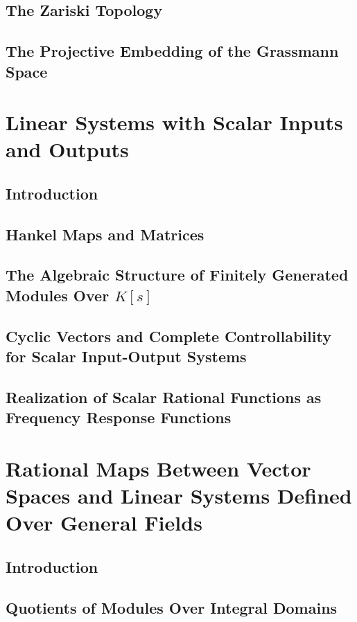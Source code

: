 \documentclass[12pt]{book}
\theoremstyle{plain}
\theoremstyle{definition}
\begin{document}
\section{The Zariski Topology}

\section{The Projective Embedding of the Grassmann Space}

\chapter{Linear Systems with Scalar Inputs and Outputs}

\section{Introduction}

\section{Hankel Maps and Matrices}

\section{The Algebraic Structure of Finitely Generated Modules Over $K[s]$}

\section{Cyclic Vectors and Complete Controllability for Scalar Input-Output Systems}

\section{Realization of Scalar Rational Functions as Frequency Response Functions}

\chapter{Rational Maps Between Vector Spaces and Linear Systems Defined Over General Fields}

\section{Introduction}

\section{Quotients of Modules Over Integral Domains}
\end{document}
